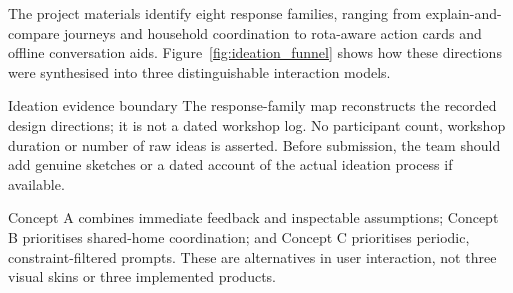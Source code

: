 \documentclass[12pt,a4paper]{article}
\begin{document}
The project materials identify eight response families, ranging from explain-and-compare journeys and household coordination to rota-aware action cards and offline conversation aids. Figure~\ref{fig:ideation_funnel} shows how these directions were synthesised into three distinguishable interaction models.

\begin{cautionbox}{Ideation evidence boundary}
The response-family map reconstructs the recorded design directions; it is not a dated workshop log. No participant count, workshop duration or number of raw ideas is asserted. Before submission, the team should add genuine sketches or a dated account of the actual ideation process if available.
\end{cautionbox}

Concept A combines immediate feedback and inspectable assumptions; Concept B prioritises shared-home coordination; and Concept C prioritises periodic, constraint-filtered prompts. These are alternatives in user interaction, not three visual skins or three implemented products.
\end{document}

